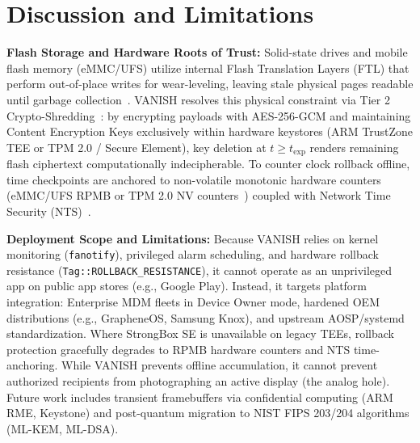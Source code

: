 \section{Discussion and Limitations}
\label{sec:discussion}

\textbf{Flash Storage and Hardware Roots of Trust:} Solid-state drives and mobile flash memory (eMMC/UFS) utilize internal Flash Translation Layers (FTL) that perform out-of-place writes for wear-leveling, leaving stale physical pages readable until garbage collection~\cite{wei2011reliably}. VANISH resolves this physical constraint via Tier 2 Crypto-Shredding~\cite{diesburg2010survey, reardon2013sok}: by encrypting payloads with AES-256-GCM and maintaining Content Encryption Keys exclusively within hardware keystores (ARM TrustZone TEE or TPM 2.0 / Secure Element), key deletion at $t \ge t_{\text{exp}}$ renders remaining flash ciphertext computationally indecipherable. To counter clock rollback offline, time checkpoints are anchored to non-volatile monotonic hardware counters (eMMC/UFS RPMB or TPM 2.0 NV counters~\cite{tpm20specification}) coupled with Network Time Security (NTS)~\cite{rfc8915nts}.

\textbf{Deployment Scope and Limitations:} Because VANISH relies on kernel monitoring (\texttt{fanotify}), privileged alarm scheduling, and hardware rollback resistance (\texttt{Tag::ROLLBACK\_RESISTANCE}), it cannot operate as an unprivileged app on public app stores (e.g., Google Play). Instead, it targets platform integration: Enterprise MDM fleets in Device Owner mode, hardened OEM distributions (e.g., GrapheneOS, Samsung Knox), and upstream AOSP/systemd standardization. Where StrongBox SE is unavailable on legacy TEEs, rollback protection gracefully degrades to RPMB hardware counters and NTS time-anchoring. While VANISH prevents offline accumulation, it cannot prevent authorized recipients from photographing an active display (the analog hole). Future work includes transient framebuffers via confidential computing (ARM RME, Keystone) and post-quantum migration to NIST FIPS 203/204 algorithms (ML-KEM, ML-DSA).

